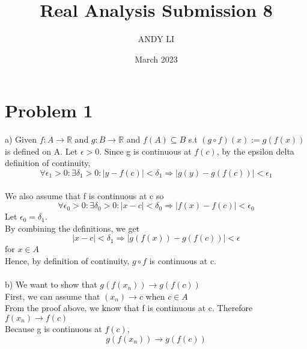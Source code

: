 \documentclass{article}
\title{Real Analysis Submission 8}
\author{ANDY LI}
\date{March 2023}
\begin{document}
\maketitle
\section*{Problem 1}
a) Given $f: A \to \mathbb{R}$ and $g: B \to \mathbb{R}$ and $f(A) \subseteq B$ s.t $(g \circ f)(x) := g(f(x))$ is defined on A.
Let $\epsilon > 0$. Since g is continuous at $f(c)$, by the epsilon delta definition of continuity, $$\forall \epsilon_1 > 0 : \exists \delta_1 > 0 : |y - f(c)| < \delta_1 \Rightarrow |g(y) - g(f(c))| < \epsilon_1$$
\\We also assume that f is continuous at c so $$\forall \epsilon_0 > 0 : \exists \delta_0 > 0: |x - c| < \delta_0 \Rightarrow |f(x) - f(c)| < \epsilon_0$$
Let $\epsilon_0 = \delta_1$.
\\By combining the definitions, we get $$|x - c| < \delta_1 \Rightarrow |g(f(x)) - g(f(c))| < \epsilon$$ for $x \in A$
\\Hence, by definition of continuity, $g \circ f$ is continuous at c.
\\
\\b) We want to show that $g(f(x_n)) \to g(f(c))$
\\First, we can assume that $(x_n) \to c$ when $c \in A$
\\From the proof above, we know that f is continuous at c. Therefore $f(x_n) \to f(c)$
\\Because g is continuous at $f(c)$, $$g(f(x_n)) \to g(f(c))$$
\end{document}
